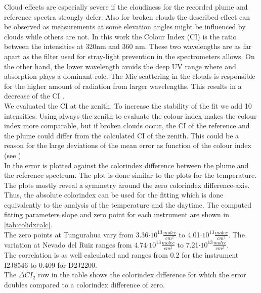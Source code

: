 Cloud effects are especially severe if the cloudiness for the recorded plume and reference spectra strongly defer. Also for broken clouds the described effect can be observed as measurements at some elevation angles might be influenced by clouds while others are not.
In this work the Colour Index (CI) is the ratio between the intensities at 320nm and 360 nm.
These two wavelengths are as far apart as the filter used for stray-light prevention in the spectrometers allows.
On the other hand, the lower wavelength avoids the deep UV range where  and   absorption plays a dominant role.
The Mie scattering in the clouds is responsible for the higher amount of radiation from larger wavelengths. This results in a decrease of the CI \citep{lubcke2014optical}.\\
We evaluated the CI at the zenith. To increase the stability of the fit we add 10 intensities. Using always the zenith to evaluate the colour index makes the colour index more comparable, but if broken clouds occur, the CI of the reference and the plume could differ from the calculated CI of the zenith. This could be a reason for the large deviations of the mean  error as function of the colour index (see )\\
In  the  error is plotted against the colorindex difference between the plume and the reference spectrum. The plot is done similar to the plots for the temperature.
The plots mostly reveal a symmetry around the zero colorindex difference-axis. Thus, the absolute colorindex can be used for the fitting which is done equivalently to the analysis of the temperature and the daytime. The computed fitting parameters slope and zero point for each instrument are shown in \cref{tab:colidxcalc}. \\
The zero points at Tungurahua vary from 3.36$\cdot10^{13}\frac{molec}{cm^2}$ to 4.01$\cdot10^{13}\frac{molec}{cm^2}$. The variation at Nevado del Ruiz ranges from  4.74$\cdot10^{13}\frac{molec}{cm^2}$ to 7.21$\cdot10^{13}\frac{molec}{cm^2}$.\\
The correlation is as well calculated and ranges from 0.2 for the instrument I2J8546 to  0.409 for D2J2200.\\
The $\Delta CI_{2}$ row in the table shows the colorindex difference for which the error doubles compared to a colorindex difference of zero.
